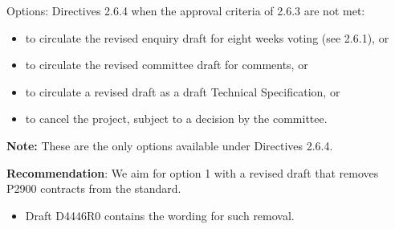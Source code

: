 \begin{frame}[t]{Options: Directives 2.6.4}
when the approval criteria of 2.6.3 are not met:
\begin{itemize}
  \item to circulate the revised enquiry draft for eight weeks voting (see 2.6.1), or
  \item to circulate the revised committee draft for comments, or
  \item to circulate a revised draft as a draft Technical Specification, or
  \item to cancel the project, subject to a decision by the committee.
\end{itemize}

\vspace{1em}
\textbf{Note:} These are the only options available under Directives 2.6.4.

\vspace{1em}
\textbf{Recommendation}: We aim for option 1 with a revised draft that removes P2900 contracts from the standard.
\begin{itemize}
  \item Draft D4446R0 contains the wording for such removal.
\end{itemize}
\end{frame}